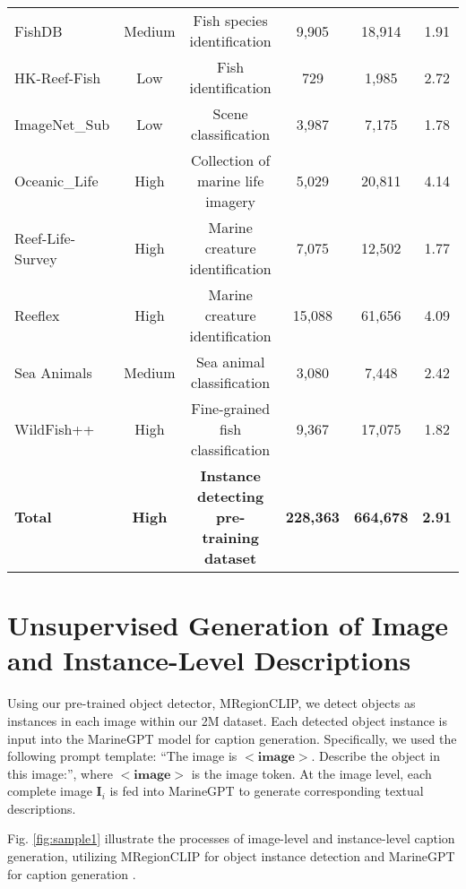\begin{table*}[t!]
{\begin{tabular}{ l | c | c | c | c | c }
     FishDB \cite{fishdb} & Medium & Fish species identification & 9,905 & 18,914 & 1.91 \\ 
     HK-Reef-Fish \cite{hk_reef_fish} & Low & Fish identification & 729 & 1,985 & 2.72 \\ 
     ImageNet\_Sub \cite{imagenet_sub} & Low & Scene classification & 3,987 & 7,175 & 1.78 \\ 
     Oceanic\_Life \cite{oceanic_life} & High & Collection of marine life imagery & 5,029 & 20,811 & 4.14 \\ 
     Reef-Life-Survey \cite{reef_life_survey} & High & Marine creature identification & 7,075 & 12,502 & 1.77 \\ 
     Reeflex \cite{reeflex} & High & Marine creature identification & 15,088 & 61,656 & 4.09 \\ 
     Sea Animals \cite{sea_animal} & Medium & Sea animal classification & 3,080 & 7,448 & 2.42 \\ 
     WildFish++ \cite{wildfishpp} & High & Fine-grained fish classification & 9,367 & 17,075 & 1.82 \\ 
     \hline
     \textbf{Total} & \textbf{High} & \textbf{Instance detecting pre-training dataset} & \textbf{228,363} & \textbf{664,678} & \textbf{2.91} \\ 
    \hline
    \end{tabular}}
    \label{t:pretraining_datasets}
\end{table*}

\section{Unsupervised Generation of Image and Instance-Level Descriptions}
\label{unsupervised}
Using our pre-trained object detector, MRegionCLIP, we detect objects as instances in each image within our 2M dataset. 
Each detected object instance is input into the MarineGPT model for caption generation. 
Specifically, we used the following prompt template: ``The image is $<\textbf{image}>$. Describe the object in this image:'', where $<\textbf{image}>$ is the
image token.
At the image level, each complete image $\textbf{I}_{i}$ is fed into MarineGPT to generate corresponding textual descriptions.

Fig. \ref{fig:sample1} illustrate the processes of image-level and instance-level caption generation, utilizing MRegionCLIP for object instance detection and MarineGPT for caption generation \cite{zheng2023marinegpt}.



